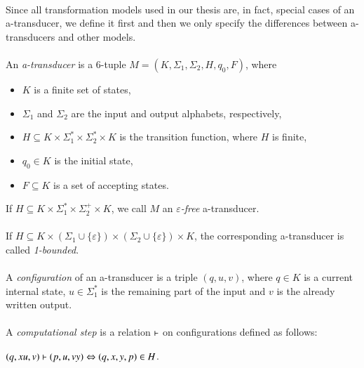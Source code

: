 \paragraph{}
Since all transformation models used in our thesis are, in fact, special cases of an a-transducer, we define it first and then we only specify the differences between a-transducers and other models.

\paragraph{}
 An \emph{a-transducer} is a 6-tuple $M=(K, \Sigma_{1}, \Sigma_{2}, H, q_{0}, F)$, where
\begin{itemize}
\item $K$ is a finite set of states,
\item $\Sigma_{1} $ and $\Sigma_{2} $ are the input and output alphabets, respectively,
\item $H \subseteq K \times \Sigma_{1}^{*} \times \Sigma_{2}^{*} \times K$ is the transition function, where $H$ is finite,
\item $q_{0} \in K$ is the initial state,
\item $F \subseteq K$ is a set of accepting states.
\end{itemize}
If $H \subseteq K \times \Sigma_{1}^{*} \times \Sigma_{2}^{+} \times K$, we call $M$ an \emph{$\varepsilon $-free} a-transducer.

\paragraph{}
 If $H \subseteq K \times (\Sigma_{1} \cup \{ \varepsilon \}) \times (\Sigma_{2} \cup \{ \varepsilon \}) \times K$, the corresponding a-transducer is called \emph{1-bounded}.

\paragraph{}
 A \emph{configuration} of an a-transducer is a triple $(q, u, v)$, where $q \in K$ is a current internal state, $u \in \Sigma_{1}^{*}$ is the remaining part of the input and $v$ is the already written output.

\paragraph{}
 A \emph{computational step} is a relation $\vdash$ on configurations defined as follows: \\
\centerline{$(q, xu, v) \vdash (p, u, vy) \Leftrightarrow (q, x, y, p) \in H$.}

